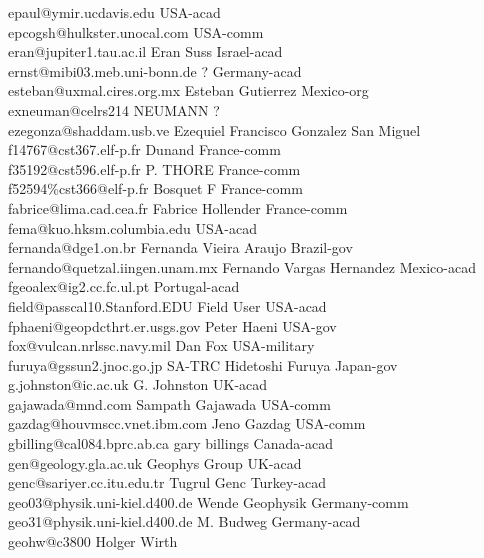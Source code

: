 \begin{tabbing}
epaul@ymir.ucdavis.edu \> \> USA-acad\\
epcogsh@hulkster.unocal.com   \> \>   USA-comm \\
eran@jupiter1.tau.ac.il \>  Eran Suss \> Israel-acad\\
ernst@mibi03.meb.uni-bonn.de \> ? \> Germany-acad\\
esteban@uxmal.cires.org.mx \> Esteban Gutierrez \> Mexico-org\\
exneuman@celrs214 \> NEUMANN \> ? \\
ezegonza@shaddam.usb.ve \> Ezequiel Francisco Gonzalez San Miguel \>\\
f14767@cst367.elf-p.fr \> Dunand  \> France-comm\\
f35192@cst596.elf-p.fr \> P. THORE \> France-comm\\
f52594\%cst366@elf-p.fr \> Bosquet F \> France-comm\\
fabrice@lima.cad.cea.fr \> Fabrice Hollender \> France-comm\\
fema@kuo.hksm.columbia.edu \> \> USA-acad\\
fernanda@dge1.on.br \> Fernanda Vieira Araujo \> Brazil-gov\\
fernando@quetzal.iingen.unam.mx \> Fernando Vargas Hernandez \> Mexico-acad\\
fgeoalex@ig2.cc.fc.ul.pt \> \> Portugal-acad\\
field@passcal10.Stanford.EDU \> Field User \> USA-acad\\
fphaeni@geopdcthrt.er.usgs.gov \> Peter Haeni \> USA-gov\\
fox@vulcan.nrlssc.navy.mil \> Dan Fox \>  USA-military\\
furuya@gssun2.jnoc.go.jp \> SA-TRC Hidetoshi Furuya \> Japan-gov\\
g.johnston@ic.ac.uk \>G. Johnston \> UK-acad\\
gajawada@mnd.com \> Sampath Gajawada \> USA-comm\\
gazdag@houvmscc.vnet.ibm.com \> Jeno Gazdag \> USA-comm\\
gbilling@cal084.bprc.ab.ca \> gary billings \> Canada-acad\\
gen@geology.gla.ac.uk \> Geophys Group \> UK-acad\\
genc@sariyer.cc.itu.edu.tr \> Tugrul Genc \> Turkey-acad\\
geo03@physik.uni-kiel.d400.de \> Wende Geophysik \> Germany-comm\\
geo31@physik.uni-kiel.d400.de \> M. Budweg \> Germany-acad\\
geohw@c3800 \> Holger Wirth \> \\

\end{tabbing}
